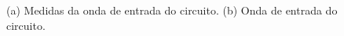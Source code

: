 \documentclass[a4paper]{article} %
\begin{document}
\begin{figure}[h!]
\begin{centering}
\par\end{centering}
\caption{(a) Medidas da onda de entrada do circuito. (b) Onda de entrada do circuito. \label{fig:ret-circ1}}
\end{figure}

\end{document}
